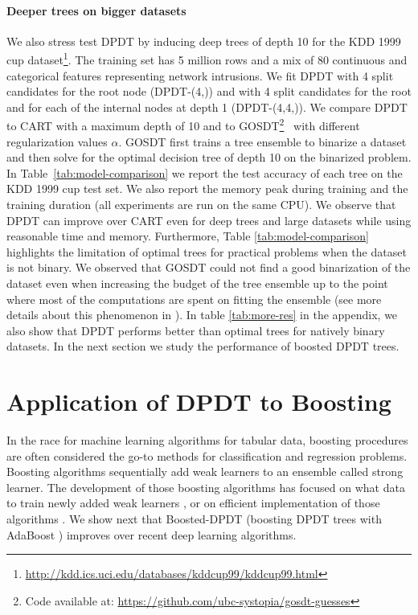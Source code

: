 \paragraph{Deeper trees on bigger datasets} We also stress test DPDT by inducing deep trees of depth 10 for the KDD 1999 cup dataset\footnote{\url{http://kdd.ics.uci.edu/databases/kddcup99/kddcup99.html}}. The training set has 5 million rows and a mix of 80 continuous and categorical features representing network intrusions. We fit DPDT with 4 split candidates for the root node (DPDT-(4,)) and with 4 split candidates for the root and for each of the internal nodes at depth 1 (DPDT-(4,4,)). We compare DPDT to CART with a maximum depth of 10 and to GOSDT\footnote{Code available at: \url{https://github.com/ubc-systopia/gosdt-guesses}}~\cite{mctavish2022fast} with different regularization values $\alpha$. GOSDT first trains a tree ensemble to binarize a dataset and then solve for the optimal decision tree of depth 10 on the binarized problem. In Table~\ref{tab:model-comparison} we report the test accuracy of each tree on the KDD 1999 cup test set. We also report the memory peak during training and the training duration (all experiments are run on the same CPU). We observe that DPDT can improve over CART even for deep trees and large datasets while using reasonable time and memory. Furthermore, Table \ref{tab:model-comparison} highlights the limitation of optimal trees for practical problems when the dataset is not binary. We observed that GOSDT could not find a good binarization of the dataset even when increasing the budget of the tree ensemble up to the point where most of the computations are spent on fitting the ensemble (see more details about this phenomenon in \cite[section 5.3]{mctavish2022fast}). In table \ref{tab:more-res} in the appendix, we also show that DPDT performs better than optimal trees for natively binary datasets. In the next section we study the performance of boosted DPDT trees.

\section{Application of DPDT to Boosting}

In the race for machine learning algorithms for tabular data, boosting procedures are often considered the go-to methods for classification and regression problems. Boosting algorithms \cite{FREUND1997119,stcohFriedman,FriedmanBoosting} sequentially add weak learners to an ensemble called strong learner. The development of those boosting algorithms has focused on what data to train newly added weak learners \cite{stcohFriedman,FriedmanBoosting},  or on efficient implementation of those algorithms \cite{xgb,10.5555/3327757.3327770}. We show next that Boosted-DPDT (boosting DPDT trees with AdaBoost \cite{FREUND1997119}) improves over recent deep learning algorithms. 

